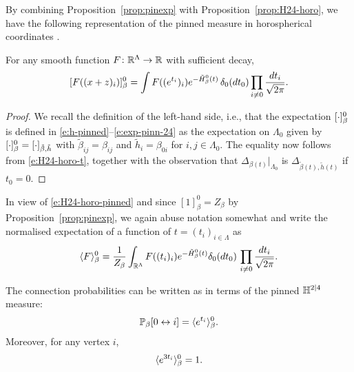 \documentclass[11pt]{amsart}
\numberwithin{equation}{section}
\numberwithin{theorem}{section}
\begin{document}
By combining Proposition~\ref{prop:pinexp} with
Proposition~\ref{prop:H24-horo}, we have the following representation
of the pinned measure in horospherical coordinates .

\begin{corollary}
  \label{cor:horo-pin1}
  For any smooth function $F\colon \mathbb{R}^\Lambda \to \mathbb{R}$ with sufficient decay,
  \begin{equation} \label{e:H24-horo-pinned}
    [{F((x+z)_i)}]_{\beta}^0
    =
    \int F((e^{t_i})_{i}) e^{-\tilde
      H_\beta^0(t)}\, \delta_0(dt_0) \prod_{i\neq 0} \frac{dt_i}{\sqrt{2\pi}}. 
  \end{equation}
\end{corollary}

\begin{proof}
  We recall the definition of the left-hand side, i.e., that the
  expectation $[{\cdot}]_\beta^0$ is defined in
  \eqref{e:h-pinned}--\eqref{e:exp-pinn-24} as the expectation
  on $\Lambda_{0}$ given by
  $[{\cdot}]^{0}_\beta = [{\cdot}]_{\tilde\beta,\tilde h}$ with
  $\tilde \beta_{ij}=\beta_{ij}$ and $\tilde h_i = \beta_{0i}$ for
  $i,j\in\Lambda_0$.  The equality now follows from
  \eqref{e:H24-horo-t}, together with the observation that
  $\Delta_{\beta(t)}|_{\Lambda_0}$ is
  $\Delta_{\tilde \beta(t),\tilde h(t)}$ if $t_{0}=0$.
\end{proof}


In view of \eqref{e:H24-horo-pinned} and since
  $[1]_{\beta}^{0}=Z_{\beta}$ by Proposition~\ref{prop:pinexp}, we again abuse notation somewhat
and write the normalised expectation of a function of $t=(t_i)_{i\in\Lambda}$ as
\begin{equation} \label{e:expectation-horo-pinned}
  \langle F \rangle_\beta^0 = \frac{1}{Z_{\beta}}\int_{\mathbb{R}^\Lambda} F((t_i)_i) e^{-\tilde H_\beta^0(t)} \delta_0(dt_0)\, \prod_{i \neq 0} \frac{dt_i}{\sqrt{2\pi}} .
\end{equation}

\begin{corollary}
  \label{cor:horo-pin2}
  The connection probabilities can be written as in terms of
  the pinned $\mathbb{H}^{2|4}$ measure:
  \begin{equation} \label{e:connspin-horo}
    \mathbb{P}_\beta[0\leftrightarrow i] = \langle e^{t_i} \rangle_{\beta}^0.
  \end{equation}
  Moreover, for any vertex $i$,
    \begin{equation}
      \label{e:connspin-horo-pin}
      \langle e^{3t_{i}} \rangle_{\beta}^{0}=1.
    \end{equation}
\end{corollary}
\end{document}
